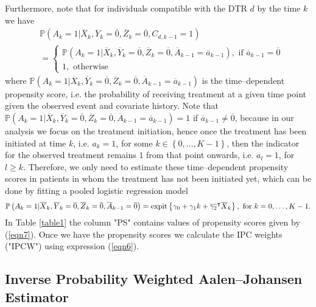 \documentclass[12pt]{article}
\begin{document}
Furthermore, note that for individuals compatible with the DTR $d$ by the time $k$ we have
\begin{align}
\label{eqn7}
\nonumber
&\mathbb{P} \left( A_k = 1 \vert \overline{X}_k,  \overline{Y}_k = \overline{0}, \overline{Z}_k = \overline{0}, C_{d,k-1} = 1 \right) \\
&=
\begin{cases}
	\mathbb{P} \left( A_k = 1 \vert \overline{X}_k,  \overline{Y}_k = \overline{0}, \overline{Z}_k = \overline{0},  \overline{A}_{k-1} = \overline{a}_{k-1} \right),\text{ if } \overline{a}_{k-1} = \overline{0} \\
	1,\text{ otherwise}
\end{cases}
\end{align}
where $\mathbb{P} \left( A_k = 1 \vert \overline{X}_k, \overline{Y}_k = \overline{0}, \overline{Z}_k = \overline{0}, \overline{A}_{k-1} = \overline{a}_{k-1} \right)$ is the time--dependent propensity score, i.e. the probability of receiving treatment at a given time point given the observed event and covariate history. Note that $\mathbb{P} \left( A_k = 1 \vert \overline{X}_k,  \overline{Y}_k = \overline{0}, \overline{Z}_k = \overline{0},  \overline{A}_{k-1} = \overline{a}_{k-1} \right) = 1$ if $\overline{a}_{k-1} \neq \overline{0}$,  because in our analysis we focus on the treatment initiation, hence once the treatment has been initiated at time $k$, i.e. $a_k = 1$, for some $k \in \left\lbrace 0, \dots, K-1 \right\rbrace$,  then the indicator for the observed treatment remains $1$ from that point onwards, i.e. $a_l = 1$, for $l \geq k$. Therefore, we only need to estimate these time--dependent propensity scores in patients in whom the treatment has not been initiated yet, which can be done by fitting a pooled logistic regression model
\begin{equation*}
\mathbb{P} \left( A_k = 1 \vert \overline{X}_k, \overline{Y}_k = \overline{0}, \overline{Z}_k = \overline{0}, \overline{A}_{k-1} = \overline{0} \right) = \text{expit} \left\lbrace \gamma_0 + \gamma_1 k + \overline{\gamma_2}^\intercal \overline{X}_k \right\rbrace, \text{ for } k = 0, \dots, K-1.
\end{equation*}
\indent
In Table \ref{table1} the column "PS" contains values of propensity scores given by (\ref{eqn7}). Once we have the propensity scores we calculate the IPC weights ("IPCW") using expression (\ref{eqn6}). 

\subsection{Inverse Probability Weighted Aalen--Johansen Estimator} \label{subsection:label3}
\end{document}
